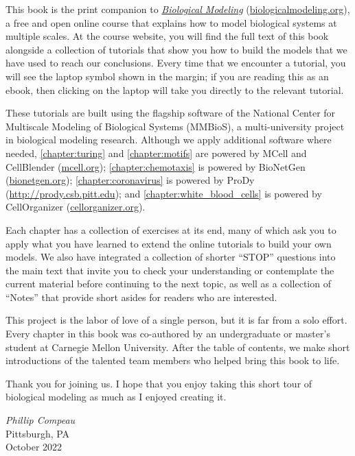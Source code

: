 This book is the print companion to \href{https://biologicalmodeling.org}{\textit{Biological Modeling}} (\href{https://biologicalmodeling.org}{biologicalmodeling.org}), a free and open online course that explains how to model biological systems at multiple scales. At the course website, you will find the full text of this book alongside a collection of tutorials that show you how to build the models that we have used to reach our conclusions. Every time that we encounter a tutorial, you will see the laptop symbol shown in the margin; if you are reading this as an ebook, then clicking on the laptop will take you directly to the relevant tutorial.\tutorial[]

These tutorials are built using the flagship software of the National Center for Multiscale Modeling of Biological Systems (MMBioS), a multi-university project in biological modeling research. Although we apply additional software where needed, \autoref{chapter:turing} and \autoref{chapter:motifs} are powered by MCell and CellBlender (\url{mcell.org}); \autoref{chapter:chemotaxis} is powered by BioNetGen (\url{bionetgen.org}); \autoref{chapter:coronavirus} is powered by ProDy (\url{http://prody.csb.pitt.edu}); and \autoref{chapter:white_blood_cells} is powered by CellOrganizer (\url{cellorganizer.org}).

Each chapter has a collection of exercises at its end, many of which ask you to apply what you have learned to extend the online tutorials to build your own models. We  also have integrated a collection of shorter ``STOP'' questions into the main text that invite you to check your understanding or contemplate the current material before continuing to the next topic, as well as a collection of ``Notes'' that provide short asides for readers who are interested.

This project is the labor of love of a single person, but it is far from a solo effort. Every chapter in this book was co-authored by an undergraduate or master's student at Carnegie Mellon University. After the table of contents, we make short introductions of the talented team members who helped bring this book to life.

Thank you for joining us. I hope that you enjoy taking this short tour of biological modeling as much as I enjoyed creating it.

\begin{flushright}
\textit{Phillip Compeau}\\
{Pittsburgh, PA}\\
{October 2022}
\end{flushright}

